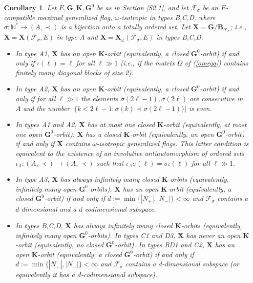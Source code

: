 \documentclass{amsart}
\newtheorem{corollary}{Corollary}
\theoremstyle{definition}
\newcommand{\bs}[1]{\boldsymbol{#1}}
\begin{document}
\begin{corollary}
\label{C3}
Let $E,\mathbf{G},\mathbf{K},\mathbf{G}^0$ be as in Section \ref{S2.1},
and let $\mathcal{F}_\sigma$ be an $E$-compatible maximal generalized flag, $\omega$-isotropic in types B,C,D, where $\sigma:\mathbb{N}^*\to (A,\prec)$ is a bijection onto a totally ordered set.
Let $\mathbf{X}=\mathbf{G}/\mathbf{B}_{\mathcal{F}_\sigma}$; i.e., $\mathbf{X}=\mathbf{X}(\mathcal{F}_\sigma,E)$ in type A and $\mathbf{X}=\mathbf{X}_\omega(\mathcal{F}_\sigma,E)$ in types B,C,D.

\begin{itemize}
\item[\rm ($\mbox{a}_1$)] In type A1, 
$\mathbf{X}$ has an open $\mathbf{K}$-orbit (equivalently, a closed $\mathbf{G}^0$-orbit) if and only if $\iota(\ell)=\ell$ for all $\ell\gg 1$ (i.e., if the matrix $\Omega$ of (\ref{omega}) contains finitely many diagonal blocks of size 2).%
\item[\rm ($\mbox{a}_2$)]
In type A2, $\mathbf{X}$ has an open $\mathbf{K}$-orbit (equivalently, a closed $\mathbf{G}^0$-orbit) if and only if
for all $\ell\gg 1$ the elements
$\sigma(2\ell-1),\sigma(2\ell)$ are consecutive in $A$ and 
the number $|\{k<2\ell-1:\sigma(k)\prec\sigma(2\ell-1)\}|$ is even.
\item[\rm ($\mbox{a}'_{12}$)]
In types A1 and A2, 
$\mathbf{X}$ has at most one closed $\mathbf{K}$-orbit
(equivalently, at most one open $\mathbf{G}^0$-orbit).  $\mathbf{X}$ has a closed $\mathbf{K}$-orbit (equivalently, an open $\mathbf{G}^0$-orbit) if and only if $\mathbf{X}$ contains $\omega$-isotropic generalized flags. This latter condition is equivalent to the existence of an 
involutive antiautomorphism of ordered sets $\iota_A:(A,\prec)\to(A,\prec)$ such that
$\iota_A\sigma(\ell)=\sigma\iota(\ell)$ for all $\ell\gg 1$.
\item[\rm ($\mbox{a}_3$)] In type A3,
$\mathbf{X}$ has always infinitely many closed $\mathbf{K}$-orbits (equivalently, infinitely many open $\mathbf{G}^0$-orbits).
$\mathbf{X}$ has an open $\mathbf{K}$-orbit (equivalently, a closed $\mathbf{G}^0$-orbit)
if and only if $d:=\min\{|N_+|,|N_-|\}<\infty$ and $\mathcal{F}_\sigma$
contains a $d$-dimensional and a $d$-codimensional subspace.
\item[\rm (bcd)] In types B,C,D,
$\mathbf{X}$ has always infinitely many closed $\mathbf{K}$-orbits (equivalently, infinitely many open $\mathbf{G}^0$-orbits).
In types C1 and D3, $\mathbf{X}$ has never an open $\mathbf{K}$-orbit (equivalently, no closed $\mathbf{G}^0$-orbit).
In types BD1 and C2, $\mathbf{X}$ has an open $\mathbf{K}$-orbit (equivalently, a closed $\mathbf{G}^0$-orbit)
if and only if $d:=\min\{|N_+|,|N_-|\}<\infty$ and $\mathcal{F}_\sigma$ contains a $d$-dimensional subspace (or equivalently it has a $d$-codimensional subspace).
\end{itemize}
\end{corollary}
\end{document}
